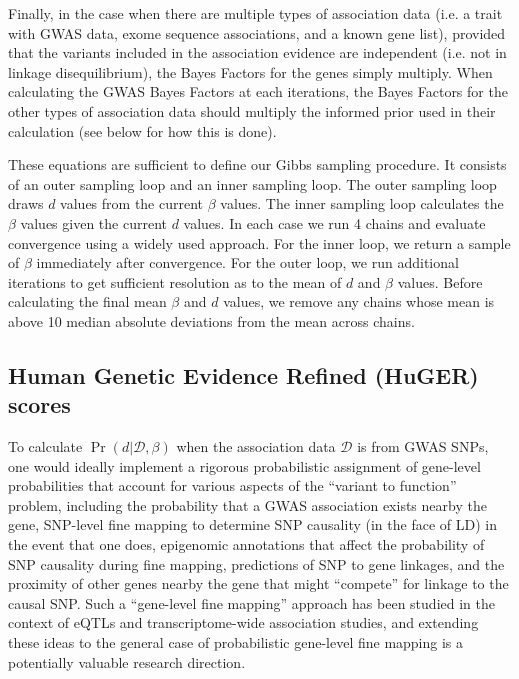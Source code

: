 \documentclass[11pt]{article}
\begin{document}
Finally, in the case when there are multiple types of association data
(i.e. a trait with GWAS data, exome sequence associations, and a known
gene list), provided that the variants included in the association
evidence are independent (i.e. not in linkage disequilibrium), the
Bayes Factors for the genes simply multiply. When calculating the GWAS
Bayes Factors at each iterations, the Bayes Factors for the other
types of association data should multiply the informed prior used in
their calculation (see below for how this is done).

These equations are sufficient to define our Gibbs sampling
procedure. It consists of an outer sampling loop and an inner sampling
loop. The outer sampling loop draws $d$ values from the current
$\beta$ values. The inner sampling loop calculates the $\beta$ values
given the current $d$ values. In each case we run 4 chains and evaluate
convergence using a widely used approach\cite{}. For the inner loop,
we return a sample of $\beta$ immediately after convergence. For the
outer loop, we run additional iterations to get sufficient resolution
as to the mean of $d$ and $\beta$ values. Before calculating the final mean $\beta$ and $d$ values, we
remove any chains whose mean is above 10 median absolute deviations
from the mean across chains.

\subsection{Human Genetic Evidence Refined (HuGER) scores}

To calculate $\Pr\left(d|\mathcal{D},\beta\right)$
when the association data $\mathcal{D}$ is from GWAS SNPs, one would
ideally implement a rigorous probabilistic assignment of gene-level
probabilities that account for various aspects of the ``variant to
function''\cite{} problem, including the probability that a GWAS
association exists nearby the gene, SNP-level fine mapping to
determine SNP causality (in the face of LD) in the event that one
does, epigenomic annotations that affect the probability of SNP
causality during fine mapping, predictions of SNP to gene linkages,
and the proximity of other genes nearby the gene that might
``compete'' for linkage to the causal SNP. Such a ``gene-level fine
mapping'' approach has been studied in the context of eQTLs\cite{} and
transcriptome-wide association studies\cite{}, and extending these
ideas to the general case of probabilistic gene-level fine mapping
is a potentially valuable research direction. 
\end{document}
